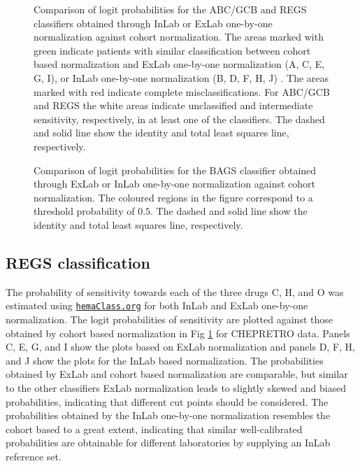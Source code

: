 \documentclass[10pt,letterpaper]{article}
\newcommand{\hemaClass}{\href{http://hemaClass.org}{\texttt{hemaClass.org}}}
\begin{document}
\begin{figure}
	\begin{center}
	\end{center}
	\caption{
		Comparison of logit probabilities for the ABC/GCB and REGS classifiers obtained through InLab or ExLab one-by-one normalization against cohort normalization.
		The areas marked with green indicate patients with similar classification between cohort based normalization and ExLab one-by-one normalization (A, C, E, G, I), or InLab one-by-one normalization (B, D, F, H, J) .
		The areas marked with red indicate complete misclassifications.
		For ABC/GCB and REGS the white areas indicate unclassified and intermediate sensitivity, respectively, in at least one of the classifiers.
		The dashed and solid line show the identity and total least squares line, respectively.
	}
	\label{fig:ABCGCBDrug}
\end{figure}

\begin{figure}
	\begin{center}
	\end{center}
	\caption{
		Comparison of logit probabilities for the BAGS classifier obtained through ExLab or InLab one-by-one normalization against cohort normalization.
		The coloured regions in the figure correspond to a threshold probability of $0.5$.
		The dashed and solid line show the identity and total least squares line, respectively.
	}
	\label{fig:Bagscorr}
\end{figure}
\newpage



\subsection*{REGS classification}
The probability of sensitivity towards each of the three drugs C, H, and O was estimated using \hemaClass{} for both InLab and ExLab one-by-one normalization.
The logit probabilities of sensitivity are plotted against those obtained by cohort based normalization in Fig \ref{fig:ABCGCBDrug} for CHEPRETRO data.
Panels C, E, G, and I show the plots based on ExLab normalization and panels D, F, H, and J show the plots for the InLab based normalization.
The probabilities obtained by ExLab and cohort based normalization are comparable, but similar to the other classifiers ExLab normalization leads to slightly skewed and biased probabilities, indicating that different cut points should be considered.
The probabilities obtained by the InLab one-by-one normalization resembles the cohort based to a great extent, indicating that similar well-calibrated probabilities are obtainable for different laboratories by supplying an InLab reference set.
\end{document}
